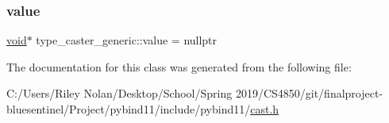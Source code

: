 \mbox{\label{classtype__caster__generic_a077b8d1e4af829443b2e41c3e5786f4d}} 
\subsubsection{\texorpdfstring{value}{value}}
{\footnotesize\ttfamily \mbox{\hyperlink{_s_d_l__opengles2__gl2ext_8h_ae5d8fa23ad07c48bb609509eae494c95}{void}}$\ast$ type\+\_\+caster\+\_\+generic\+::value = nullptr}



The documentation for this class was generated from the following file\+:\begin{DoxyCompactItemize}
\item 
C\+:/\+Users/\+Riley Nolan/\+Desktop/\+School/\+Spring 2019/\+C\+S4850/git/finalproject-\/bluesentinel/\+Project/pybind11/include/pybind11/\mbox{\hyperlink{cast_8h}{cast.\+h}}\end{DoxyCompactItemize}
